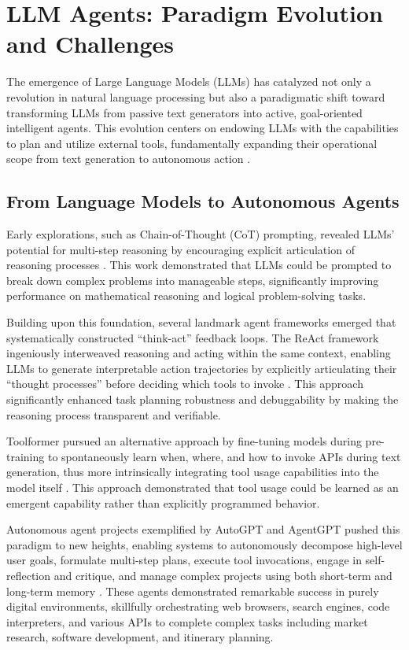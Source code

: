 \section{LLM Agents: Paradigm Evolution and Challenges}

The emergence of Large Language Models (LLMs) has catalyzed not only a revolution in natural language processing but also a paradigmatic shift toward transforming LLMs from passive text generators into active, goal-oriented intelligent agents. This evolution centers on endowing LLMs with the capabilities to plan and utilize external tools, fundamentally expanding their operational scope from text generation to autonomous action \cite{mialon2023augmented}.

\subsection{From Language Models to Autonomous Agents}

Early explorations, such as Chain-of-Thought (CoT) prompting, revealed LLMs' potential for multi-step reasoning by encouraging explicit articulation of reasoning processes \cite{wei2022chain}. This work demonstrated that LLMs could be prompted to break down complex problems into manageable steps, significantly improving performance on mathematical reasoning and logical problem-solving tasks.

Building upon this foundation, several landmark agent frameworks emerged that systematically constructed ``think-act'' feedback loops. The ReAct framework ingeniously interweaved reasoning and acting within the same context, enabling LLMs to generate interpretable action trajectories by explicitly articulating their ``thought processes'' before deciding which tools to invoke \cite{yao2022react}. This approach significantly enhanced task planning robustness and debuggability by making the reasoning process transparent and verifiable.

Toolformer pursued an alternative approach by fine-tuning models during pre-training to spontaneously learn when, where, and how to invoke APIs during text generation, thus more intrinsically integrating tool usage capabilities into the model itself \cite{schick2023toolformer}. This approach demonstrated that tool usage could be learned as an emergent capability rather than explicitly programmed behavior.

Autonomous agent projects exemplified by AutoGPT and AgentGPT pushed this paradigm to new heights, enabling systems to autonomously decompose high-level user goals, formulate multi-step plans, execute tool invocations, engage in self-reflection and critique, and manage complex projects using both short-term and long-term memory \cite{richards2023autogpt}. These agents demonstrated remarkable success in purely digital environments, skillfully orchestrating web browsers, search engines, code interpreters, and various APIs to complete complex tasks including market research, software development, and itinerary planning.

